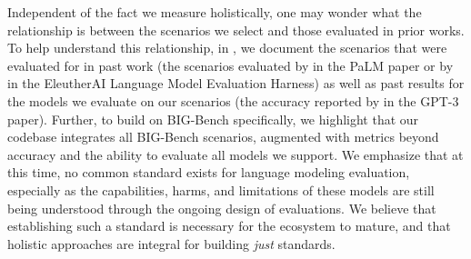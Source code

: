 Independent of the fact we measure holistically, one may wonder what the relationship is between the scenarios we select and those evaluated in prior works.
To help understand this relationship, in , we document the scenarios that were evaluated for in past work (\eg the scenarios evaluated by \citet{chowdhery2022palm} in the PaLM paper or by \citet{gao2021harness} in the EleutherAI Language Model Evaluation Harness) as well as past results for the models we evaluate on our scenarios (\eg the \hellaswag accuracy reported by \citet{brown2020gpt3} in the GPT-3 paper).
Further, to build on BIG-Bench specifically, we highlight that our codebase integrates all BIG-Bench scenarios, augmented with metrics beyond accuracy and the ability to evaluate all models we support.
We emphasize that at this time, no common standard exists for language modeling evaluation, especially as the capabilities, harms, and limitations of these models are still being understood through the ongoing design of evaluations.
We believe that establishing such a standard is necessary for the ecosystem to mature, and that holistic approaches are integral for building \textit{just} standards.

